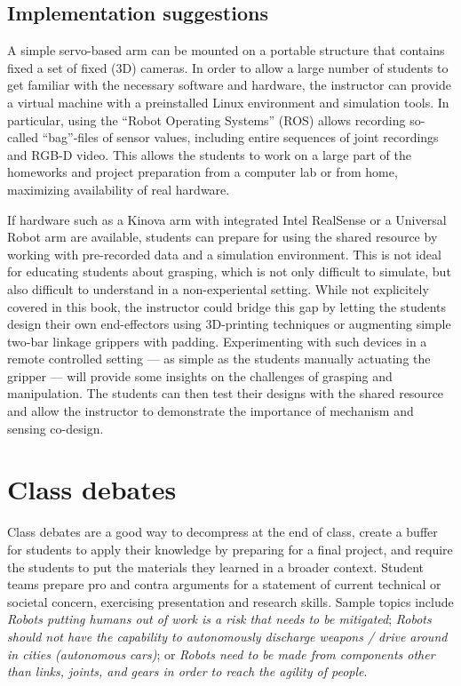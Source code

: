 \subsection{Implementation suggestions}
A simple servo-based arm can be mounted on a portable structure that contains fixed a set of fixed (3D) cameras. In order to allow a large number of students to get familiar with the necessary software and hardware, the instructor can provide a virtual machine with a preinstalled Linux environment and simulation tools. In particular, using the ``Robot Operating Systems'' (ROS) allows recording so-called ``bag''-files of sensor values, including entire sequences of joint recordings and RGB-D video. This allows the students to work on a large part of the homeworks and project preparation from a computer lab or from home, maximizing availability of real hardware.

If hardware such as a Kinova arm with integrated Intel RealSense or a Universal Robot arm are available, students can prepare for using the shared resource by working with pre-recorded data and a simulation environment. This is not ideal for educating students about grasping, which is not only difficult to simulate, but also difficult to understand in a non-experiental setting. While not explicitely covered in this book, the instructor could bridge this gap by letting the students design their own end-effectors using 3D-printing techniques or augmenting simple two-bar linkage grippers with padding. Experimenting with such devices in a remote controlled setting --- as simple as the students manually actuating the gripper --- will provide some insights on the challenges of grasping and manipulation. The students can then test their designs with the shared resource and allow the instructor to demonstrate the importance of mechanism and sensing co-design.


\section{Class debates}\label{sec:debates}
Class debates are a good way to decompress at the end of class, create a buffer for students to apply their knowledge by preparing for a final project, and require the students to put the materials they learned in a broader context. Student teams prepare pro and contra arguments for a statement of current technical or societal concern, exercising presentation and research skills. Sample topics include \emph{Robots putting humans out of work is a risk that needs to be mitigated}; \emph{Robots should not have the capability to autonomously discharge weapons / drive around in cities (autonomous cars)}; or \emph{Robots need to be made from components other than links, joints, and gears in order to reach the agility of people}.

